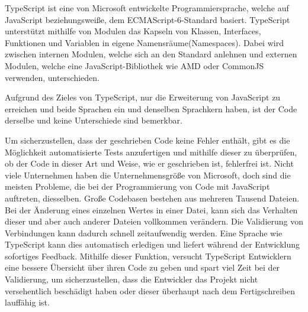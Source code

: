 
TypeScript ist eine von Microsoft entwickelte Programmiersprache, welche auf JavaScript beziehungsweiße, dem ECMAScript-6-Standard basiert. TypeScript unterstützt mithilfe von Modulen das Kapseln von Klassen, Interfaces, Funktionen und Variablen in eigene Namensräume(Namespaces). Dabei wird zwischen internen Modulen, welche sich an den Standard anlehnen und externen Modulen, welche eine JavaScript-Bibliothek wie AMD oder CommonJS verwenden, unterschieden.
\cite{TypeScript}



Aufgrund des Zieles von TypeScript, nur die Erweiterung von JavaScript zu erreichen und beide Sprachen ein und denselben Sprachkern haben, ist der Code derselbe und keine Unterschiede sind bemerkbar. 
\cite{TypeScript}


Um sicherzustellen, dass der geschrieben Code keine Fehler enthält, gibt es die Möglichkeit automatisierte Tests anzufertigen und mithilfe dieser zu überprüfen, ob der Code in dieser Art und Weise, wie er geschrieben ist, fehlerfrei ist.
Nicht viele Unternehmen haben die Unternehmensgröße von Microsoft, doch sind die meisten Probleme, die bei der Programmierung von Code mit JavaScript auftreten, diesselben. Große Codebasen bestehen aus mehreren Tausend Dateien. Bei der Änderung eines einzelnen Wertes in einer Datei, kann sich das Verhalten dieser und aber auch anderer Dateien vollkommen verändern.
Die Validierung von Verbindungen kann dadurch schnell zeitaufwendig werden. Eine Sprache wie TypeScript kann dies automatisch erledigen und liefert während der Entwicklung sofortiges Feedback. Mithilfe dieser Funktion, versucht TypeScript Entwicklern eine bessere Übersicht über ihren Code zu geben und spart viel Zeit bei der Validierung, um sicherzustellen, dass die Entwickler das Projekt nicht versehentlich beschädigt haben oder dieser überhaupt nach dem Fertigschreiben lauffähig ist.

\cite{ScriptWiki}

